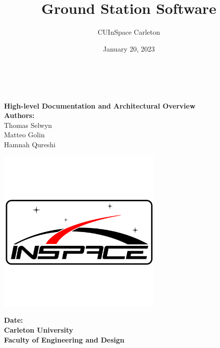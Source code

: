 \title{Ground Station Software}
\author{CUInSpace Carleton}
\date{January 20, 2023}

\makeatletter
    \begin{titlepage}
        \begin{center}
        {}
        {\fontsize{34}{50}\selectfont \bf \@title}\\ 
	    {\ \\}
        \vbox{}\vspace{5cm}
            \centering
            {\bf\Large High-level Documentation and Architectural Overview}\\[3cm] 
            {\large \textbf{Authors:}\\}
            {\large Thomas Selwyn\\}
            {\large Matteo Golin\\}
            {\large Hamnah Qureshi\\}
            \begin{center}
                \includegraphics[width=8cm]{images/cuinspace_logo.png}
            \end{center}
            {\large \textbf{Date:} \@date\\}
            {\large \textbf{Carleton University}\\}
            {\large \textbf{Faculty of Engineering and Design}\\}
        \end{center}
    \end{titlepage}
\makeatother